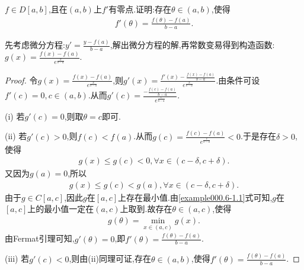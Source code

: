 \documentclass[../../main.tex]{subfiles}%
\begin{document}
\begin{example}
$f\in D[a,b]$,且在$(a,b)$上$f'$有零点.证明:存在$\theta \in (a,b)$,使得
\begin{align*}
f'(\theta) = \frac{f(\theta) -f(a)}{b-a}.
\end{align*}
\end{example}
\begin{remark}
先考虑微分方程:$y' =\frac{y-f(a)}{b-a}$,解出微分方程的解,再常数变易得到构造函数:$g(x) =\frac{f(x) -f(a)}{e^{\frac{x}{b-a}}}$.
\end{remark}
\begin{proof}
令$g(x) =\frac{f(x) -f(a)}{e^{\frac{x}{b-a}}}$,则$g'(x) =\frac{f'(x) -\frac{f(x) -f(a)}{b-a}}{e^{\frac{x}{b-a}}}$.由条件可设$f'(c) =0,c\in (a,b)$.从而$g'(c) =\frac{-\frac{f(c) -f(a)}{b-a}}{e^{\frac{c}{b-a}}}$.

(i) 若$g'(c) =0$,则取$\theta =c$即可.

(ii) 若$g'(c) >0$,则$f(c) <f(a)$.从而$g(c) =\frac{f(c) -f(a)}{e^{\frac{c}{b-a}}}<0$.于是存在$\delta >0$,使得
\begin{align*}
g(x) \leqslant g(c) <0,\forall x\in (c-\delta ,c+\delta).
\end{align*}
又因为$g(a) =0$,所以
\begin{align}
g(x) \leqslant g(c) <g(a),\forall x\in (c-\delta ,c+\delta).\label{example000.6-1.1}
\end{align}
由于$g\in C[a,c]$,因此$g$在$[a,c]$上存在最小值.由\eqref{example000.6-1.1}式可知,$g$在$[a,c]$上的最小值一定在$(a,c)$上取到.故存在$\theta \in (a,c)$,使得
\begin{align*}
g(\theta) =\min_{x\in (a,c)}g(x).
\end{align*}
由Fermat引理可知,$g'(\theta) =0$,即$f'(\theta) =\frac{f(\theta) -f(a)}{b-a}$.

(iii) 若$g'(c) <0$,则由(ii)同理可证,存在$\theta \in (a,b)$,使得$f'(\theta) =\frac{f(\theta) -f(a)}{b-a}$.
\end{proof}
\end{document}
